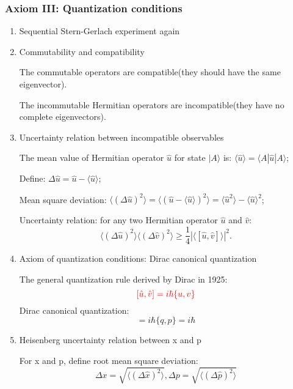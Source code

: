 \documentclass[12pt]{article}
\numberwithin{equation}{section}
\begin{document}
\subsubsection{Axiom III: Quantization conditions}
\begin{enumerate}
\item Sequential Stern-Gerlach experiment again
\item Commutability and compatibility \par
	The commutable operators are compatible(they should have the same eigenvector). \par
	The incommutable Hermitian operators are incompatible(they have no complete eigenvectors).
\item Uncertainty relation between incompatible observables \par
	The mean value of Hermitian operator $\hat{u}$ for state $|A\rangle$ is: $\langle\hat{u}\rangle=\langle A|\hat{u}|A\rangle$; \par
	Define: $\Delta \hat{u}=\hat{u}-\langle\hat{u}\rangle$; \par
	Mean square deviation: $\langle(\Delta \hat{u})^2\rangle=\langle(\hat{u}-\langle\hat{u}\rangle)^2\rangle=\langle\hat{u}^2\rangle-\langle\hat{u}\rangle^2$; \par
	Uncertainty relation: for any two Hermitian operator $\hat{u}$ and $\hat{v}$: 
	\begin{equation}
		\langle (\Delta \hat{u})^2\rangle\langle(\Delta \hat{v})^2\rangle 
		\geq \frac{1}{4}|\langle[\hat{u},\hat{v}]\rangle|^2.
	\end{equation}
\item {\color{red}Axiom of quantization conditions}: Dirac canonical quantization \par
	The general quantization rule derived by Dirac in 1925:
	\begin{equation}
		{\color{red}[\hat{u},\hat{v}]=i\hbar \{u, v\}}
	\end{equation}
	Dirac canonical quantization:
	\begin{equation}
		[\hat{q},\hat{p}]=i\hbar \{q, p\}=i\hbar
	\end{equation}
\item Heisenberg uncertainty relation between x and p \par
	For x and p, define root mean square deviation:
	\begin{equation}
		\Delta x=\sqrt{\langle(\Delta \hat{x})^2 \rangle}, 
		\Delta p=\sqrt{\langle(\Delta \hat{p})^2 \rangle}
	\end{equation}

\end{enumerate}
\end{document}
